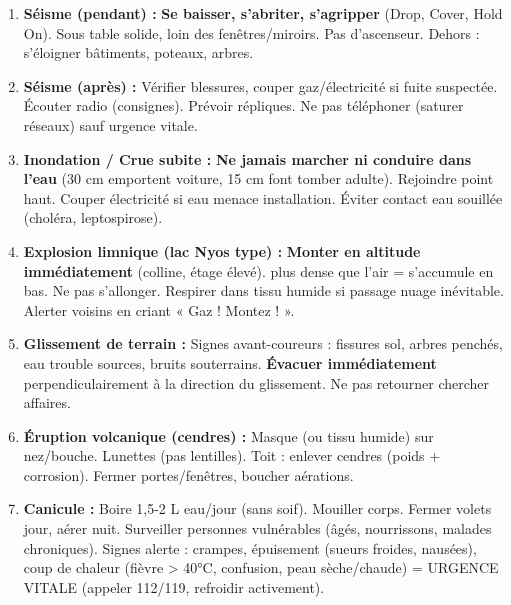 \documentclass[11pt]{article}
\newcounter{popsec}
\newcounter{popsub}
\newcommand{\courssub}[1]{%
  \stepcounter{popsub}%
  \par\vspace{9pt}\noindent{\popxbold\fontsize{11.5}{13}\selectfont\color{popink}{\color{poporange}\thepopsec.\thepopsub}\hspace{6pt}#1}\par\nopagebreak\vspace{4pt}
}
\begin{document}
\begin{methode}
\begin{enumerate}
    \item \textbf{Séisme (pendant) :} \textbf{Se baisser, s'abriter, s'agripper} (Drop, Cover, Hold On). Sous table solide, loin des fenêtres/miroirs. Pas d'ascenseur. Dehors : s'éloigner bâtiments, poteaux, arbres.
    \item \textbf{Séisme (après) :} Vérifier blessures, couper gaz/électricité si fuite suspectée. Écouter radio (consignes). Prévoir répliques. Ne pas téléphoner (saturer réseaux) sauf urgence vitale.
    \item \textbf{Inondation / Crue subite :} \textbf{Ne jamais marcher ni conduire dans l'eau} (30 cm emportent voiture, 15 cm font tomber adulte). Rejoindre point haut. Couper électricité si eau menace installation. Éviter contact eau souillée (choléra, leptospirose).
    \item \textbf{Explosion limnique (lac Nyos type) :} \textbf{Monter en altitude immédiatement} (colline, étage élevé).  plus dense que l'air = s'accumule en bas. Ne pas s'allonger. Respirer dans tissu humide si passage nuage inévitable. Alerter voisins en criant « Gaz ! Montez ! ».
    \item \textbf{Glissement de terrain :} Signes avant-coureurs : fissures sol, arbres penchés, eau trouble sources, bruits souterrains. \textbf{Évacuer immédiatement} perpendiculairement à la direction du glissement. Ne pas retourner chercher affaires.
    \item \textbf{Éruption volcanique (cendres) :} Masque (ou tissu humide) sur nez/bouche. Lunettes (pas lentilles). Toit : enlever cendres (poids + corrosion). Fermer portes/fenêtres, boucher aérations.
    \item \textbf{Canicule :} Boire 1,5-2 L eau/jour (sans soif). Mouiller corps. Fermer volets jour, aérer nuit. Surveiller personnes vulnérables (âgés, nourrissons, malades chroniques). Signes alerte : crampes, épuisement (sueurs froides, nausées), coup de chaleur (fièvre > 40°C, confusion, peau sèche/chaude) = URGENCE VITALE (appeler 112/119, refroidir activement).
\end{enumerate}
\end{methode}

\courssub{Synthèse et exercice résolu}
\end{document}
